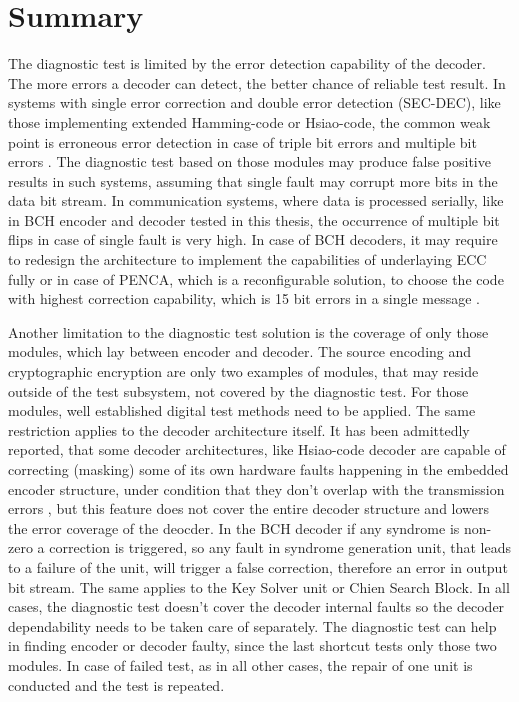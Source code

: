 \chapter{Summary}

The diagnostic test is limited by the error detection capability of the decoder. The more errors a decoder can detect, the better chance of reliable test result. In systems with single error correction and double error detection (SEC-DEC), like those implementing extended Hamming-code or Hsiao-code, the common weak point is erroneous error detection in case of triple bit errors and multiple bit errors \cite{art:Dicorato}. The diagnostic test based on those modules may produce false positive results in such systems, assuming that single fault may corrupt more bits in the data bit stream. In communication systems, where data is processed serially, like in BCH encoder and decoder tested in this thesis, the occurrence of multiple bit flips in case of single fault is very high. In case of BCH decoders, it may require to redesign the architecture to implement the capabilities of underlaying ECC fully or in case of PENCA, which is a reconfigurable solution, to choose the code with highest correction capability, which is 15 bit errors in a single message \cite{art:Pfeifer}.

Another limitation to the diagnostic test solution is the coverage of only those modules, which lay between encoder and decoder. The source encoding and cryptographic encryption are only two examples of modules, that may reside outside of the test subsystem, not covered by the diagnostic test. For those modules, well established digital test methods need to be applied. The same restriction applies to the decoder architecture itself. It has been admittedly reported, that some decoder architectures, like Hsiao-code decoder are capable of correcting (masking) some of its own hardware faults happening in the embedded encoder structure, under condition that they don't overlap with the transmission errors \cite{art:Dicorato}, but this feature does not cover the entire decoder structure and lowers the error coverage of the deocder. In the BCH decoder if any syndrome is non-zero a correction is triggered, so any fault in syndrome generation unit, that leads to a failure of the unit, will trigger a false correction, therefore an error in output bit stream. The same applies to the Key Solver unit or Chien Search Block. In all cases, the diagnostic test doesn't cover the decoder internal faults so the decoder dependability needs to be taken care of separately. The diagnostic test can help in finding encoder or decoder faulty, since the last shortcut tests only those two modules. In case of failed test, as in all other cases, the repair of one unit is conducted and the test is repeated.

